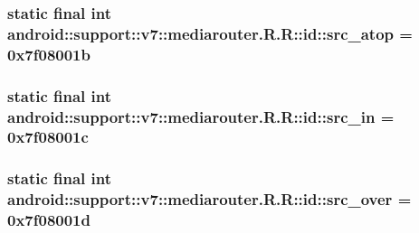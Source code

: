\hypertarget{classandroid_1_1support_1_1v7_1_1mediarouter_1_1_r_1_1id_e4dc511f7ce4760a8af703a69476bcab}{
\subsubsection[{src\_\-atop}]{\setlength{\rightskip}{0pt plus 5cm}static final int android::support::v7::mediarouter.R.R::id::src\_\-atop = 0x7f08001b}}
\label{classandroid_1_1support_1_1v7_1_1mediarouter_1_1_r_1_1id_e4dc511f7ce4760a8af703a69476bcab}


\hypertarget{classandroid_1_1support_1_1v7_1_1mediarouter_1_1_r_1_1id_454182f2383f58e4d58d1ae77655ae89}{
\subsubsection[{src\_\-in}]{\setlength{\rightskip}{0pt plus 5cm}static final int android::support::v7::mediarouter.R.R::id::src\_\-in = 0x7f08001c}}
\label{classandroid_1_1support_1_1v7_1_1mediarouter_1_1_r_1_1id_454182f2383f58e4d58d1ae77655ae89}


\hypertarget{classandroid_1_1support_1_1v7_1_1mediarouter_1_1_r_1_1id_edaba975b7e850ba19b1533bc131350f}{
\subsubsection[{src\_\-over}]{\setlength{\rightskip}{0pt plus 5cm}static final int android::support::v7::mediarouter.R.R::id::src\_\-over = 0x7f08001d}}
\label{classandroid_1_1support_1_1v7_1_1mediarouter_1_1_r_1_1id_edaba975b7e850ba19b1533bc131350f}


